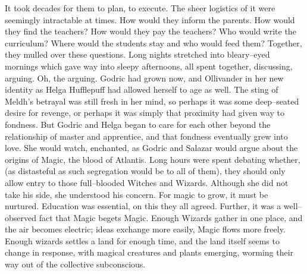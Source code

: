 It took decades for them to plan, to execute. The sheer logistics of it were seemingly intractable at times. How would they inform the parents. How would they find the teachers? How would they pay the teachers? Who would write the curriculum? Where would the students stay and who would feed them?
\SmallVSpace
Together, they mulled over these questions. Long nights stretched into bleary\mbox{--}eyed mornings which gave way into sleepy afternoons, all spent together, discussing, arguing. Oh, the arguing. Godric had grown now, and Ollivander in her new identity as Helga Hufflepuff had allowed herself to age as well. The sting of Meldh’s betrayal was still fresh in her mind, so perhaps it was some deep\mbox{--}seated desire for revenge, or perhaps it was simply that proximity had given way to fondness. But Godric and Helga began to care for each other beyond the relationship of master and apprentice, and that fondness eventually grew into love.
\SmallVSpace
She would watch, enchanted, as Godric and Salazar would argue about the origins of Magic, the blood of Atlantis. Long hours were spent debating whether, (as distasteful as such segregation would be to all of them), they should only allow entry to those full\mbox{--}blooded Witches and Wizards.
\SmallVSpace
Although she did not take his side, she understood his concern. For magic to grow, it must be nurtured. Education was essential, on this they all agreed. Further, it was a well\mbox{--}observed fact that Magic begets Magic. Enough Wizards gather in one place, and the air becomes electric; ideas exchange more easily, Magic flows more freely. Enough wizards settles a land for enough time, and the land itself seems to change in response, with magical creatures and plants emerging, worming their way out of the collective subconscious.


